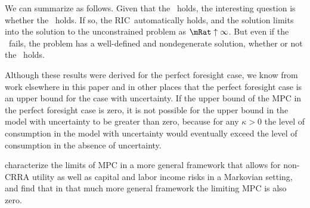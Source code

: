 \documentclass[\econtexRoot/BufferStockTheory]{subfiles}
\begin{document}
We can summarize as follows.  Given that the \PFGIC~holds, the
interesting question is whether the \FHWC~holds.  If so, the
RIC~automatically holds, and the solution limits
into the solution to the unconstrained problem as $\mRat \uparrow
\infty$.  But even if the \FHWC~fails, the problem has a
well-defined and nondegenerate solution, whether or not the \RIC~holds.

Although these results were derived for the perfect foresight case,
we know from work elsewhere in this paper and in other places that the
perfect foresight case is an upper bound for the case with uncertainty.
If the upper bound of the MPC in the perfect foresight case is zero, it
is not possible for the upper bound in the model with uncertainty to be
greater than zero, because for any $\kappa > 0$ the level of consumption
in the model with uncertainty would eventually exceed the level of consumption
in the absence of uncertainty.

\cite{MaTodaMPC} characterize the limits of MPC in a more general framework that allows for non-CRRA utility as well as capital and labor income risks in a Markovian setting, and
find that in that much more general framework the limiting MPC is also zero.

\onlyinsubfile{\pagebreak}
\end{document}
